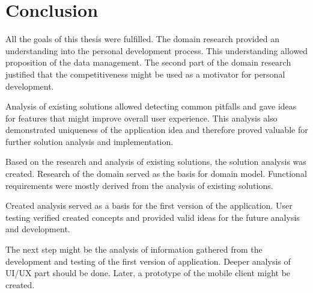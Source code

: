 
\chapter{Conclusion}\label{ch:conclusion}

All the goals of this thesis were fulfilled.
The domain research provided an understanding into the personal development process.
This understanding allowed proposition of the data management.
The second part of the domain research justified that the competitiveness might be used as a motivator for personal development.

Analysis of existing solutions allowed detecting common pitfalls and gave ideas for features that might improve overall user experience.
This analysis also demonstrated uniqueness of the application idea and therefore proved valuable for further solution analysis and implementation.

Based on the research and analysis of existing solutions, the solution analysis was created.
Research of the domain served as the basis for domain model.
Functional requirements were mostly derived from the analysis of existing solutions.

Created analysis served as a basis for the first version of the application.
User testing verified created concepts and provided valid ideas for the future analysis and development.

The next step might be the analysis of information gathered from the development and testing of the first version of application.
Deeper analysis of UI/UX part should be done.
Later, a prototype of the mobile client might be created.
